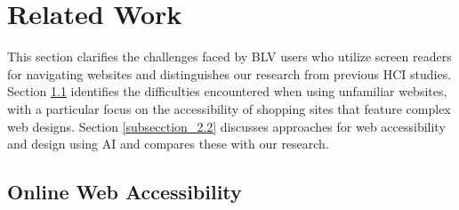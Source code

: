 \section{Related Work}
This section clarifies the challenges faced by BLV users who utilize screen readers for navigating websites and distinguishes our research from previous HCI studies. Section \ref{subsection_2.1} identifies the difficulties encountered when using unfamiliar websites, with a particular focus on the accessibility of shopping sites that feature complex web designs. Section \ref{subsecction_2.2} discusses approaches for web accessibility and design using AI and compares these with our research.

\subsection{Online Web Accessibility}
\label{subsection_2.1}
